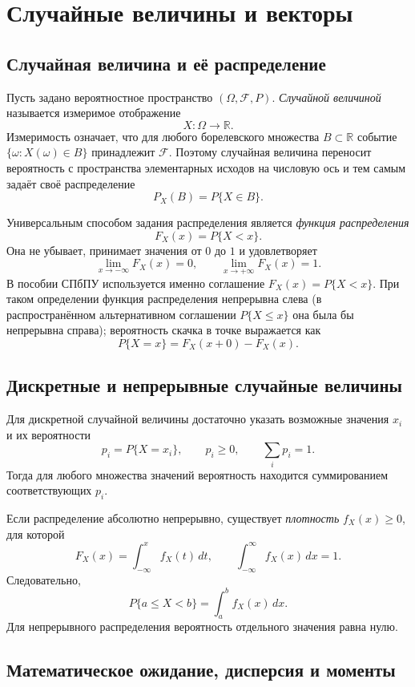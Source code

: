 \section{Случайные величины и векторы}
\label{sec:random-variables-vectors}

\subsection{Случайная величина и её распределение}

Пусть задано вероятностное пространство $(\Omega,\mathcal F,P)$. \emph{Случайной
величиной} называется измеримое отображение
\[
    X:\Omega\to\mathbb R.
\]
Измеримость означает, что для любого борелевского множества $B\subset\mathbb R$
событие $\{\omega:X(\omega)\in B\}$ принадлежит $\mathcal F$. Поэтому случайная
величина переносит вероятность с пространства элементарных исходов на числовую
ось и тем самым задаёт своё распределение
\[
    P_X(B)=P\{X\in B\}.
\]

Универсальным способом задания распределения является \emph{функция
распределения}
\[
    F_X(x)=P\{X<x\}.
\]
Она не убывает, принимает значения от $0$ до $1$ и удовлетворяет
\[
    \lim_{x\to-\infty}F_X(x)=0,\qquad
    \lim_{x\to+\infty}F_X(x)=1.
\]
В пособии СПбПУ используется именно соглашение $F_X(x)=P\{X<x\}$.
При таком определении функция распределения непрерывна слева (в распространённом
альтернативном соглашении $P\{X\leq x\}$ она была бы непрерывна справа);
вероятность скачка в точке выражается как
\[
    P\{X=x\}=F_X(x+0)-F_X(x).
\]

\subsection{Дискретные и непрерывные случайные величины}

Для дискретной случайной величины достаточно указать возможные значения $x_i$
и их вероятности
\[
    p_i=P\{X=x_i\},\qquad p_i\geq0,\qquad \sum_i p_i=1.
\]
Тогда для любого множества значений вероятность находится суммированием
соответствующих $p_i$.

Если распределение абсолютно непрерывно, существует \emph{плотность}
$f_X(x)\geq0$, для которой
\[
    F_X(x)=\int_{-\infty}^{x} f_X(t)\,dt,
    \qquad
    \int_{-\infty}^{\infty}f_X(x)\,dx=1.
\]
Следовательно,
\[
    P\{a\leq X<b\}=\int_a^b f_X(x)\,dx.
\]
Для непрерывного распределения вероятность отдельного значения равна нулю.

\subsection{Математическое ожидание, дисперсия и моменты}


